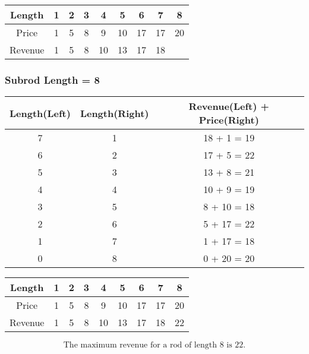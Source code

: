 \begin{table}[H]
	\centering
	\begin{tabular}{| c | c | c | c | c | c | c | c | c |}
		\hline
		Length
		&	1
		&	2
		&	3
		&	4
		&	5
		&	6
		&	7
		&	8\\
		\hline
		Price
		&	1
		&	5
		&	8
		&	9
		&	10
		&	17
		&	17
		&	20\\
		\hline
		Revenue
		&	1
		&	5
		&	8
		&	10
		&	13
		&	17
		&	18
		&	\\
		\hline
	\end{tabular}
\end{table}

\subsubsection*{Subrod Length = 8}

\begin{table}[H]
	\centering
	\begin{tabular}{| c | c | c |}
		\hline
		Length(Left)	&	Length(Right)	&	Revenue(Left) + Price(Right)\\
		\hline
		7
		&	1
		&	18 + 1 = 19\\
		\hline
		6
		&	2
		&	17 + 5 = 22\\
		\hline
		5
		&	3
		&	13 + 8 = 21\\
		\hline
		4
		&	4
		&	10 + 9 = 19\\
		\hline
		3
		&	5
		&	8 + 10 = 18\\
		\hline
		2
		&	6
		&	5 + 17 = 22\\
		\hline
		1
		&	7
		&	1 + 17 = 18\\
		\hline
		0
		&	8
		&	0 + 20 = 20\\
		\hline
	\end{tabular}	
\end{table}

\begin{table}[H]
	\centering
	\begin{tabular}{| c | c | c | c | c | c | c | c | c |}
		\hline
		Length
		&	1
		&	2
		&	3
		&	4
		&	5
		&	6
		&	7
		&	8\\
		\hline
		Price
		&	1
		&	5
		&	8
		&	9
		&	10
		&	17
		&	17
		&	20\\
		\hline
		Revenue
		&	1
		&	5
		&	8
		&	10
		&	13
		&	17
		&	18
		&	22\\
		\hline
	\end{tabular}
\end{table}

$$
\text{The maximum revenue for a rod of length 8 is 22.}
$$